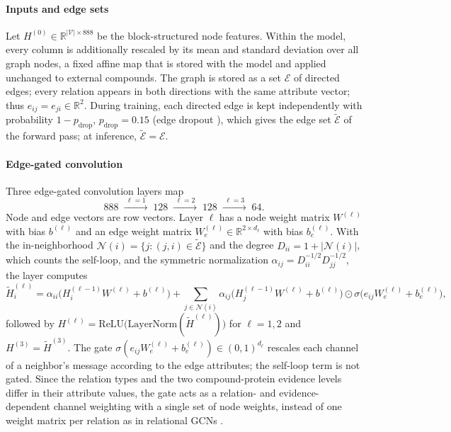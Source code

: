 \documentclass[11pt,letterpaper]{article}
\begin{document}
\paragraph{Inputs and edge sets}
Let $H^{(0)}\in\mathbb{R}^{|\mathcal{V}|\times 888}$ be the block-structured node features. Within the model, every column is additionally rescaled by its mean and standard deviation over all graph nodes, a fixed affine map that is stored with the model and applied unchanged to external compounds. The graph is stored as a set $\mathcal{E}$ of directed edges; every relation appears in both directions with the same attribute vector; thus $e_{ij}=e_{ji}\in\mathbb{R}^2$. During training, each directed edge is kept independently with probability $1-p_{\text{drop}}$, $p_{\text{drop}}=0.15$ (edge dropout \cite{rong2020dropedge}), which gives the edge set $\tilde{\mathcal{E}}$ of the forward pass; at inference, $\tilde{\mathcal{E}}=\mathcal{E}$.

\paragraph{Edge-gated convolution}
Three edge-gated convolution layers map
\[
888 \;\xrightarrow{\;\ell=1\;}\; 128 \;\xrightarrow{\;\ell=2\;}\; 128 \;\xrightarrow{\;\ell=3\;}\; 64.
\]
Node and edge vectors are row vectors. Layer $\ell$ has a node weight matrix $W^{(\ell)}$ with bias $b^{(\ell)}$ and an edge weight matrix $W_e^{(\ell)}\in\mathbb{R}^{2\times d_\ell}$ with bias $b_e^{(\ell)}$. With the in-neighborhood $\mathcal{N}(i)=\{j:(j,i)\in\tilde{\mathcal{E}}\}$ and the degree $D_{ii}=1+|\mathcal{N}(i)|$, which counts the self-loop, and the symmetric normalization $\alpha_{ij} = D_{ii}^{-1/2} D_{jj}^{-1/2}$, the layer computes
\begin{equation}
\tilde{H}^{(\ell)}_i = \alpha_{ii}\big(H^{(\ell-1)}_i W^{(\ell)}+b^{(\ell)}\big) + \sum_{j\in\mathcal{N}(i)} \alpha_{ij}\big(H^{(\ell-1)}_j W^{(\ell)}+b^{(\ell)}\big)\odot\sigma\!\big(e_{ij} W_e^{(\ell)}+b_e^{(\ell)}\big),
\label{eq:conv}
\end{equation}
followed by $H^{(\ell)}=\mathrm{ReLU}\big(\mathrm{LayerNorm}(\tilde{H}^{(\ell)})\big)$ for $\ell=1,2$ and $H^{(3)}=\tilde{H}^{(3)}$. The gate $\sigma(e_{ij}W_e^{(\ell)}+b_e^{(\ell)})\in(0,1)^{d_\ell}$ rescales each channel of a neighbor's message according to the edge attributes; the self-loop term is not gated. Since the relation types and the two compound-protein evidence levels differ in their attribute values, the gate acts as a relation- and evidence-dependent channel weighting with a single set of node weights, instead of one weight matrix per relation as in relational GCNs \cite{schlichtkrull2018modeling}.
\end{document}
